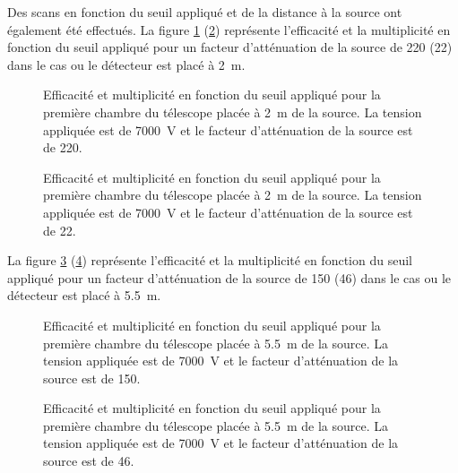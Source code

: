 Des scans en fonction du seuil appliqué et de la distance à la source ont également été effectués. La figure \ref{att200} (\ref{att22}) représente l'efficacité et la multiplicité en fonction du seuil appliqué pour un facteur d'atténuation de la source de \num{220} (\num{22}) dans le cas ou le détecteur est placé à \SI{2}{\meter}.

\begin{figure}[ht!]
	\centering
	\hfill
	\caption{Efficacité et multiplicité en fonction du seuil appliqué pour la première chambre du télescope placée à \SI{2}{\meter} de la source. La tension appliquée est de \SI{7000}{\volt} et le facteur d'atténuation de la source est de \num{220}.}
	\label{att200}
\end{figure}

\begin{figure}[ht!]
	\centering
	\hfill
	\caption{Efficacité et multiplicité en fonction du seuil appliqué pour la première chambre du télescope placée à \SI{2}{\meter} de la source. La tension appliquée est de \SI{7000}{\volt} et le facteur d'atténuation de la source est de \num{22}.}
	\label{att22}
\end{figure}

La figure \ref{att150} (\ref{att46}) représente l'efficacité et la multiplicité en fonction du seuil appliqué pour un facteur d'atténuation de la source de \num{150} (\num{46}) dans le cas ou le détecteur est placé à \SI{5.5}{\meter}.

\begin{figure}[ht!]
	\centering
	\hfill
	\caption{Efficacité et multiplicité en fonction du seuil appliqué pour la première chambre du télescope placée à \SI{5.5}{\meter} de la source. La tension appliquée est de \SI{7000}{\volt} et le facteur d'atténuation de la source est de \num{150}.}
	\label{att150}
\end{figure}

\begin{figure}[ht!]
	\centering
	\hfill
	\caption{Efficacité et multiplicité en fonction du seuil appliqué pour la première chambre du télescope placée à \SI{5.5}{\meter} de la source. La tension appliquée est de \SI{7000}{\volt} et le facteur d'atténuation de la source est de \num{46}.}
	\label{att46}
\end{figure}


